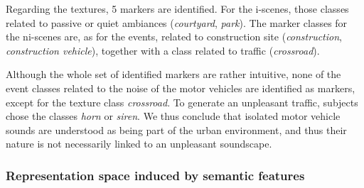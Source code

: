 \documentclass[12pt]{elsarticle}
\begin{document}

Regarding the textures, 5 markers are identified. For the i-scenes, those classes related to passive or quiet ambiances (\emph{courtyard}, \emph{park}). The marker classes for the ni-scenes are, as for the events, related to construction site (\emph{construction}, \emph{construction vehicle}), together with a class related to traffic (\emph{crossroad}).


Although the whole set of identified markers are rather intuitive, none of the event classes related to the noise of the motor vehicles are identified as markers, except for the texture class \emph{crossroad}. To generate an unpleasant traffic, subjects chose the classes \emph{horn} or \emph{siren}. We thus conclude that isolated motor vehicle sounds are understood as being part of the urban environment, and thus their nature is not necessarily linked to an unpleasant soundscape.

\subsubsection*{Representation space induced by semantic features}
\end{document}
